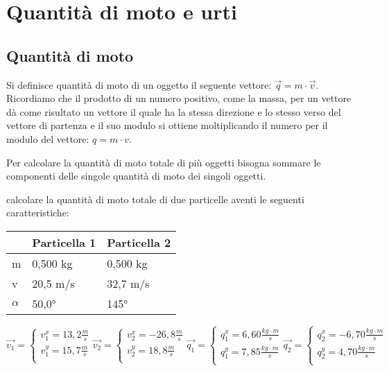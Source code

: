 \section{Quantità di moto e urti}
	\subsection{Quantità di moto}
	\par Si definisce quantità di moto di un oggetto il seguente vettore: \textbf{$\vec{q}=m\cdot\vec{v}$}. Ricordiamo che il prodotto di un numero positivo, come la massa, per un vettore dà come risultato un vettore il quale ha la stessa direzione e lo stesso verso del vettore di partenza e il suo modulo si ottiene moltiplicando il numero per il modulo del vettore: \textbf{$q=m\cdot v$}.
	\par Per calcolare la quantità di moto totale di più oggetti bisogna sommare le componenti delle singole quantità di moto dei singoli oggetti.
	\par\esempio calcolare la quantità di moto totale di due particelle aventi le seguenti caratteristiche:
	\par\begin{tabular}{| l | l | l |}
	\hline
	 & Particella 1 & Particella 2\\ \hline
	m & 0,500 kg & 0,500 kg\\ \hline
	v & 20,5 m/s & 32,7 m/s\\ \hline
	$\alpha$ & 50,0° & 145°\\ \hline
	\end{tabular}
	\begin{equation*}
	\vec{v_1}=
        \begin{cases}
            v_1^x=13,2 \frac{m}{s}\\
            v_1^y=15,7 \frac{m}{s}\\
        \end{cases}
        \vec{v_2}=
        \begin{cases}
            v_2^x=-26,8 \frac{m}{s}\\
            v_2^y=18,8 \frac{m}{s}\\
        \end{cases}
        \vec{q_1}=
        \begin{cases}
            q_1^x=6,60 \frac{kg\cdot m}{s}\\
            q_1^y=7,85 \frac{kg\cdot m}{s}\\
        \end{cases}
        \vec{q_2}=
        \begin{cases}
            q_2^x=-6,70 \frac{kg\cdot m}{s}\\
            q_2^y=4,70 \frac{kg\cdot m}{s}\\
        \end{cases}
    \end{equation*}
